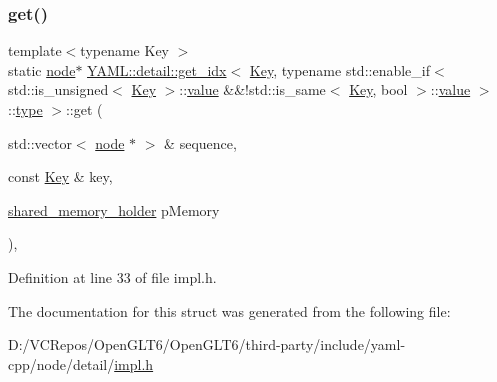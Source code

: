 \subsubsection{\texorpdfstring{get()}{get()}\hspace{0.1cm}{\footnotesize\ttfamily [2/2]}}
{\footnotesize\ttfamily template$<$typename Key $>$ \\
static \mbox{\hyperlink{class_y_a_m_l_1_1detail_1_1node}{node}}$\ast$ \mbox{\hyperlink{struct_y_a_m_l_1_1detail_1_1get__idx}{Y\+A\+M\+L\+::detail\+::get\+\_\+idx}}$<$ \mbox{\hyperlink{namespace_y_a_m_l_a67c320aa50d3de7ecba1d0b8775dd684a1af533fc24b0311b8c4d5ac2870283aa}{Key}}, typename std\+::enable\+\_\+if$<$ std\+::is\+\_\+unsigned$<$ \mbox{\hyperlink{namespace_y_a_m_l_a67c320aa50d3de7ecba1d0b8775dd684a1af533fc24b0311b8c4d5ac2870283aa}{Key}} $>$\+::\mbox{\hyperlink{glad_8h_a03aff08f73d7fde3d1a08e0abd8e84fa}{value}} \&\&!std\+::is\+\_\+same$<$ \mbox{\hyperlink{namespace_y_a_m_l_a67c320aa50d3de7ecba1d0b8775dd684a1af533fc24b0311b8c4d5ac2870283aa}{Key}}, bool $>$\+::\mbox{\hyperlink{glad_8h_a03aff08f73d7fde3d1a08e0abd8e84fa}{value}} $>$\+::\mbox{\hyperlink{glad_8h_a890efa53b3d7deeeced6f3a0d6653ed3}{type}} $>$\+::get (\begin{DoxyParamCaption}\item[{std\+::vector$<$ \mbox{\hyperlink{class_y_a_m_l_1_1detail_1_1node}{node}} $\ast$ $>$ \&}]{sequence,  }\item[{const \mbox{\hyperlink{namespace_y_a_m_l_a67c320aa50d3de7ecba1d0b8775dd684a1af533fc24b0311b8c4d5ac2870283aa}{Key}} \&}]{key,  }\item[{\mbox{\hyperlink{namespace_y_a_m_l_1_1detail_a228c4b3b6ba1058b474d40afc218e21d}{shared\+\_\+memory\+\_\+holder}}}]{p\+Memory }\end{DoxyParamCaption})\hspace{0.3cm}{\ttfamily [inline]}, {\ttfamily [static]}}



Definition at line 33 of file impl.\+h.



The documentation for this struct was generated from the following file\+:\begin{DoxyCompactItemize}
\item 
D\+:/\+V\+C\+Repos/\+Open\+G\+L\+T6/\+Open\+G\+L\+T6/third-\/party/include/yaml-\/cpp/node/detail/\mbox{\hyperlink{detail_2impl_8h}{impl.\+h}}\end{DoxyCompactItemize}
